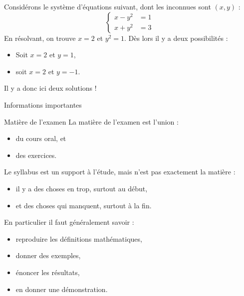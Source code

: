 \begin{frame}
\begin{example}
  Considérons le système d'équations suivant, dont les inconnues sont \((x,y)\) :
  \begin{equation*}
    \begin{cases}
      x - y^{2} &= 1\\
      x + y^{2} &= 3
    \end{cases}
  \end{equation*}
  En résolvant, on trouve \(x = 2\) et \(y^{2} = 1\). Dès lors il y a deux possibilités :
  \begin{itemize}
  \item Soit \(x = 2\) et \(y = 1\),
  \item soit \(x = 2\) et \(y = -1\).
  \end{itemize}
  Il y a donc ici deux solutions !
\end{example}
\end{frame}
\begin{frame}{Informations importantes}
  \begin{block}{Matière de l'examen}
    La matière de l'examen est l'union :
    \begin{itemize}
    \item du cours oral, et
    \item des exercices.
    \end{itemize}
    \pause

    Le syllabus est un support à l'étude, mais n'est pas exactement la matière :
    \begin{itemize}
    \item il y a des choses en trop, \pause surtout au début,\pause
    \item et des choses qui manquent, \pause surtout à la fin.
    \end{itemize}\pause

    En particulier il faut généralement savoir :\pause
    \begin{itemize}[<+->]
    \item reproduire les définitions mathématiques,
    \item donner des exemples,
    \item énoncer les résultats,
    \item en donner une démonstration.
    \end{itemize}
  \end{block}
\end{frame}
